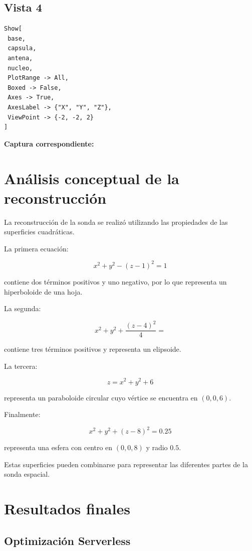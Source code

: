 \documentclass[12pt,a4paper]{article}
\begin{document}
\subsection{Vista 4}

\begin{lstlisting}
Show[
 base,
 capsula,
 antena,
 nucleo,
 PlotRange -> All,
 Boxed -> False,
 Axes -> True,
 AxesLabel -> {"X", "Y", "Z"},
 ViewPoint -> {-2, -2, 2}
]
\end{lstlisting}

\textbf{Captura correspondiente:}

\vspace{3cm}

\section{Análisis conceptual de la reconstrucción}

La reconstrucción de la sonda se realizó utilizando las propiedades
de las superficies cuadráticas.

La primera ecuación:

\[x^2+y^2-(z-1)^2=1\]

contiene dos términos positivos y uno negativo, por lo que representa
un hiperboloide de una hoja.

La segunda:

\[x^2+y^2+\frac{(z-4)^2}{4}=\]

contiene tres términos positivos y representa un elipsoide.

La tercera:

\[z=x^2+y^2+6\]

representa un paraboloide circular cuyo vértice se encuentra en
$(0,0,6)$.

Finalmente:

\[x^2+y^2+(z-8)^2=0.25\]

representa una esfera con centro en $(0,0,8)$ y radio $0.5$.

Estas superficies pueden combinarse para representar las diferentes
partes de la sonda espacial.


\section{Resultados finales}

\subsection{Optimización Serverless}
\end{document}
